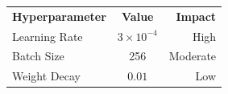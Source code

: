 \documentclass{article}
\begin{document}
\begin{tabular}{l c r}
\textbf{Hyperparameter} & \textbf{Value} & \textbf{Impact} \\
Learning Rate & $3 \times 10^{-4}$ & High \\
Batch Size & 256 & Moderate \\
Weight Decay & $0.01$ & Low \\
\end{tabular}
\end{document}
